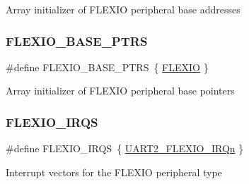 Array initializer of F\+L\+E\+X\+IO peripheral base addresses \mbox{\label{group___f_l_e_x_i_o___peripheral___access___layer_ga8dc3fff3fb50fd2fd9d2e879ead9c59d}} 
\subsubsection{\texorpdfstring{FLEXIO\_BASE\_PTRS}{FLEXIO\_BASE\_PTRS}}
{\footnotesize\ttfamily \#define F\+L\+E\+X\+I\+O\+\_\+\+B\+A\+S\+E\+\_\+\+P\+T\+RS~\{ \mbox{\hyperlink{group___f_l_e_x_i_o___peripheral___access___layer_ga42b29f5cbbe7ec3b88557b2da6b47c44}{F\+L\+E\+X\+IO}} \}}

Array initializer of F\+L\+E\+X\+IO peripheral base pointers \mbox{\label{group___f_l_e_x_i_o___peripheral___access___layer_gad1413d220005bcc97717e98dd6dbb518}} 
\subsubsection{\texorpdfstring{FLEXIO\_IRQS}{FLEXIO\_IRQS}}
{\footnotesize\ttfamily \#define F\+L\+E\+X\+I\+O\+\_\+\+I\+R\+QS~\{ \mbox{\hyperlink{group___interrupt__vector__numbers_gga666eb0caeb12ec0e281415592ae89083a5475321bd2bac9aae86ed45895c66b1f}{U\+A\+R\+T2\+\_\+\+F\+L\+E\+X\+I\+O\+\_\+\+I\+R\+Qn}} \}}

Interrupt vectors for the F\+L\+E\+X\+IO peripheral type 